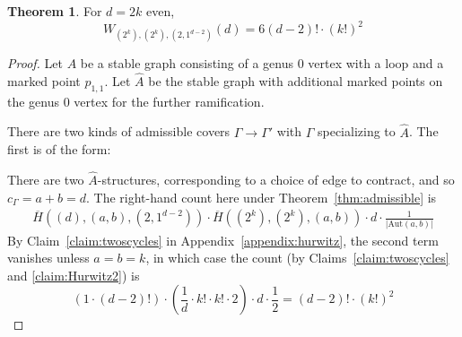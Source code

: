 \documentclass[thesis]{thesis-umich}           %
\newcommand{\Aut}{\text{Aut}}
\theoremstyle{definition}
\newtheorem{thm}{Theorem}[section]
\begin{document}
\begin{thm}
  \label{thm:genusreduction3}
  For $d=2k$ even,
  \[
  W_{(2^k),(2^k),(2,1^{d-2})}(d)=6(d-2)!\cdot (k!)^2
  \]
\end{thm}
\begin{proof}
  Let $A$ be a stable graph consisting of a genus $0$ vertex with a loop and a marked point $p_{1,1}$.
  Let $\hat A$ be the stable graph with additional marked points on the genus $0$ vertex for
  the further ramification.

There are two kinds of
admissible covers $\Gamma\to\Gamma'$ with $\Gamma$ specializing to $\hat A$. The first
is of the form:


            There are two $\hat A$-structures, corresponding to a choice
            of edge to contract, and so $c_{\Gamma}=a+b=d$. The right-hand count here under Theorem~\ref{thm:admissible} is
            \begin{align*}
              \overline H((d),(a,b),(2,1^{d-2}))\cdot \overline H((2^k),(2^k),(a,b))\cdot d\cdot\frac 1{|\Aut(a,b)|}
            \end{align*}
            By Claim~\ref{claim:twoscycles} in Appendix~\ref{appendix:hurwitz}, the second term vanishes unless $a=b=k$, in which case
            the count (by Claims~\ref{claim:twoscycles} and \ref{claim:Hurwitz2}) is
            \[
            (1\cdot (d-2)!)\cdot \left(\frac 1d\cdot k!\cdot k!\cdot 2\right)\cdot d\cdot\frac 12
            =(d-2)!\cdot (k!)^2
            \]


\end{proof}
\end{document}
